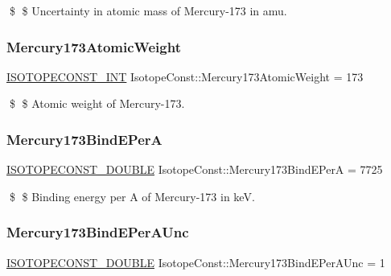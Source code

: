 \$ \$ Uncertainty in atomic mass of Mercury-\/173 in amu. \mbox{\label{group___isotope_const-_mercury-_hg173_ga41c07053854d81bc3b94c80c9c145711}} 
\subsubsection{\texorpdfstring{Mercury173\+Atomic\+Weight}{Mercury173AtomicWeight}}
{\footnotesize\ttfamily \mbox{\hyperlink{group___isotope_const-_macros_ga5f18360b3e99483a35c32d789e62621c}{I\+S\+O\+T\+O\+P\+E\+C\+O\+N\+S\+T\+\_\+\+I\+NT}} Isotope\+Const\+::\+Mercury173\+Atomic\+Weight = 173}

\$ \$ Atomic weight of Mercury-\/173. \mbox{\label{group___isotope_const-_mercury-_hg173_ga90002a053182adcb5093d145ebd01b97}} 
\subsubsection{\texorpdfstring{Mercury173\+Bind\+E\+PerA}{Mercury173BindEPerA}}
{\footnotesize\ttfamily \mbox{\hyperlink{group___isotope_const-_macros_ga8f45a7272ce02c0b4c65c44636ed719a}{I\+S\+O\+T\+O\+P\+E\+C\+O\+N\+S\+T\+\_\+\+D\+O\+U\+B\+LE}} Isotope\+Const\+::\+Mercury173\+Bind\+E\+PerA = 7725}

\$ \$ Binding energy per A of Mercury-\/173 in keV. \mbox{\label{group___isotope_const-_mercury-_hg173_gad73fd5dd0500470cf66a10ca6b0c79d1}} 
\subsubsection{\texorpdfstring{Mercury173\+Bind\+E\+Per\+A\+Unc}{Mercury173BindEPerAUnc}}
{\footnotesize\ttfamily \mbox{\hyperlink{group___isotope_const-_macros_ga8f45a7272ce02c0b4c65c44636ed719a}{I\+S\+O\+T\+O\+P\+E\+C\+O\+N\+S\+T\+\_\+\+D\+O\+U\+B\+LE}} Isotope\+Const\+::\+Mercury173\+Bind\+E\+Per\+A\+Unc = 1}

